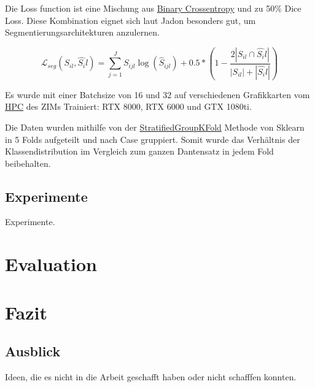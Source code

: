  Die Loss function ist eine Mischung aus 
\href{https://www.analyticsvidhya.com/blog/2021/03/binary-cross-entropy-log-loss-for-binary-classification/}{Binary Crossentropy} und zu 50\%
Dice Loss. Diese Kombination eignet sich laut Jadon  \citep{Jadon_2020} besonders gut, um Segmentierungsarchitekturen anzulernen. 

\begin{equation}
\mathcal{L}_{s e g}\left(S_{i l}, \hat{S_{i}} l\right)= \sum_{j=1}^{J} S_{i j l} \log \left(\hat{S}_{i j l}\right)+0.5 *\left(1-\frac{2\left|S_{i l} \cap \hat{S_{i}} l\right|}{\left|S_{i l}\right|+\left|\hat{S_{i}} l\right|}\right)
\end{equation}

Es wurde mit einer Batchsize von 16 und 32 auf verschiedenen Grafikkarten vom 
\href{https://wiki.hhu.de/display/HPC/Abschlussarbeiten+im+HPC}{HPC} des ZIMs Trainiert: RTX 8000, RTX 6000 und GTX 1080ti.

Die Daten wurden mithilfe von der 
\href{https://scikit-learn.org/stable/modules/generated/sklearn.model_selection.StratifiedGroupKFold.html}{StratifiedGroupKFold} Methode von Sklearn in 5 Folds aufgeteilt und nach Case gruppiert. Somit wurde das Verhältnis der Klassendistribution im Vergleich zum ganzen Dantensatz in jedem Fold beibehalten. 

\subsection{Experimente}
Experimente.

\section{Evaluation}\raggedbottom

\section{Fazit}\raggedbottom

\subsection{Ausblick}
Ideen, die es nicht in die Arbeit geschafft haben oder nicht schafffen konnten.


\pagebreak

